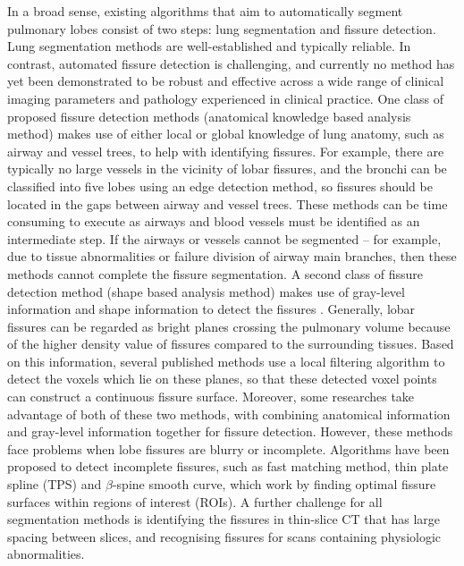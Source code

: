 \documentclass[]{spie}  %
\begin{document}
In a broad sense, existing algorithms that aim to automatically segment pulmonary lobes consist of two steps: lung segmentation and fissure detection. Lung segmentation methods are well-established and typically reliable\cite{ukil2005smoothing, sun20063d, pu2008adaptive, wang2009automated, sun2012automated}. In contrast, automated fissure detection is challenging, and currently no method has yet been demonstrated to be robust and effective across a wide range of clinical imaging parameters and pathology experienced in clinical practice. One class of proposed fissure detection methods (anatomical knowledge based analysis method) makes use of either local or global knowledge of lung anatomy, such as airway and vessel trees, to help with identifying fissures\cite{kuhnigk2005informatics, saita2006algorithm, ukil2009anatomy, pu2009computational, lassen2010automatic, doel2012pulmonary, lassen2013automatic}. For example, there are typically no large vessels in the vicinity of lobar fissures, and the bronchi can be classified into five lobes using an edge detection method, so fissures should be located in the gaps between airway and vessel trees. These methods can be time consuming to execute as airways and blood vessels must be identified as an intermediate step. If the airways or vessels cannot be segmented – for example, due to tissue abnormalities or failure division of airway main branches, then these methods cannot complete the fissure segmentation. A second class of fissure detection method (shape based analysis method) makes use of gray-level information and shape information to detect the fissures \cite{van2008supervised, van2010automatic, ross2010automatic, lassen2011interactive, doel2012pulmonary, lassen2013automatic, ross2013pulmonary}. Generally, lobar fissures can be regarded as bright planes crossing the pulmonary volume because of the higher density value of fissures compared to the surrounding tissues. Based on this information, several published methods use a local filtering algorithm to detect the voxels which lie on these planes, so that these detected voxel points can construct a continuous fissure surface. Moreover, some researches take advantage of both of these two methods, with combining anatomical information and gray-level information together for fissure detection\cite{ukil2009anatomy, doel2012pulmonary, lassen2013automatic}. However, these methods face problems when lobe fissures are blurry or incomplete. Algorithms have been proposed to detect incomplete fissures, such as fast matching method\cite{ukil2009anatomy}, thin plate spline (TPS)\cite{ross2013pulmonary} and $\beta$-spine smooth curve\cite{doel2012pulmonary}, which work by finding optimal fissure surfaces within regions of interest (ROIs). A further challenge for all segmentation methods is identifying the fissures in thin-slice CT that has large spacing between slices, and recognising fissures for scans containing physiologic abnormalities.
\end{document}
